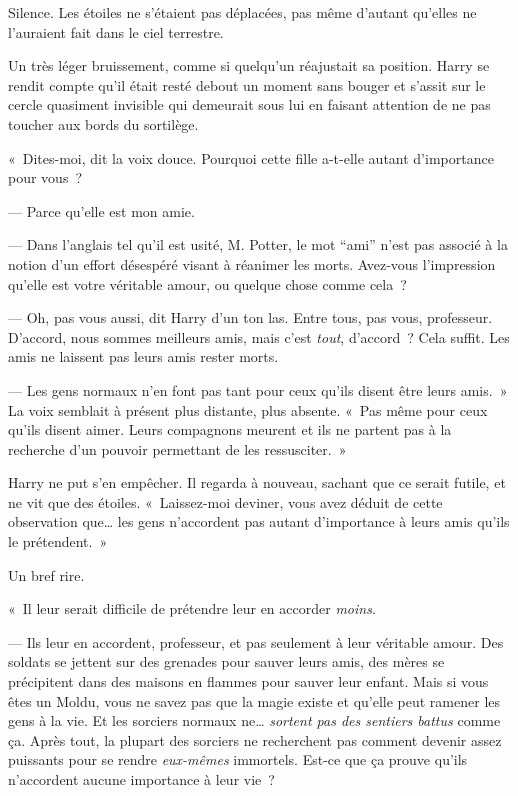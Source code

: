 Silence. Les étoiles ne s'étaient pas déplacées, pas même d'autant qu'elles ne l'auraient fait dans le ciel terrestre.

Un très léger bruissement, comme si quelqu'un réajustait sa position. Harry se rendit compte qu'il était resté debout un moment sans bouger et s'assit sur le cercle quasiment invisible qui demeurait sous lui en faisant attention de ne pas toucher aux bords du sortilège.

«~Dites-moi, dit la voix douce. Pourquoi cette fille a-t-elle autant d'importance pour vous~?

--- Parce qu'elle est mon amie.

--- Dans l'anglais tel qu'il est usité, M. Potter, le mot “ami” n'est pas associé à la notion d'un effort désespéré visant à réanimer les morts. Avez-vous l'impression qu'elle est votre véritable amour, ou quelque chose comme cela~?

--- Oh, pas vous aussi, dit Harry d'un ton las. Entre tous, pas vous, professeur. D'accord, nous sommes meilleurs amis, mais c'est \emph{tout}, d'accord~? Cela suffit. Les amis ne laissent pas leurs amis rester morts.

--- Les gens normaux n'en font pas tant pour ceux qu'ils disent être leurs amis.~» La voix semblait à présent plus distante, plus absente. «~Pas même pour ceux qu'ils disent aimer. Leurs compagnons meurent et ils ne partent pas à la recherche d'un pouvoir permettant de les ressusciter.~»

Harry ne put s'en empêcher. Il regarda à nouveau, sachant que ce serait futile, et ne vit que des étoiles. «~Laissez-moi deviner, vous avez déduit de cette observation que… les gens n'accordent pas autant d'importance à leurs amis qu'ils le prétendent.~»

Un bref rire.

«~Il leur serait difficile de prétendre leur en accorder \emph{moins}.

--- Ils leur en accordent, professeur, et pas seulement à leur véritable amour. Des soldats se jettent sur des grenades pour sauver leurs amis, des mères se précipitent dans des maisons en flammes pour sauver leur enfant. Mais si vous êtes un Moldu, vous ne savez pas que la magie existe et qu'elle peut ramener les gens à la vie. Et les sorciers normaux ne… \emph{sortent pas des sentiers battus} comme ça. Après tout, la plupart des sorciers ne recherchent pas comment devenir assez puissants pour se rendre \emph{eux-mêmes} immortels. Est-ce que ça prouve qu'ils n'accordent aucune importance à leur vie~?


